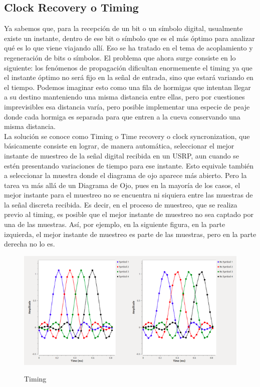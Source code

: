 \subsection{Clock Recovery o Timing}

Ya sabemos que, para la recepción de un bit o un símbolo digital, usualmente existe un instante, dentro de ese bit o símbolo que es el más óptimo para analizar qué es lo que viene viajando allí. Eso se ha tratado en el tema de acoplamiento y regeneración de bits o símbolos. El problema que ahora surge consiste en lo siguiente: los fenómenos de propagación dificultan enormemente el timing ya que el instante óptimo no será fijo en la señal de entrada, sino que estará variando en el tiempo. Podemos imaginar esto como una fila de hormigas que intentan llegar a su destino manteniendo una misma distancia entre ellas, pero por cuestiones imprevisibles esa distancia varía, pero posible implementar una especie de peaje donde cada hormiga es separada para que entren a la cueva conservando una misma distancia. \\

La solución se conoce como Timing o Time recovery o clock syncronization, que básicamente consiste en lograr, de manera automática, seleccionar el mejor instante de muestreo de la señal digital recibida en un USRP, aun cuando se estén presentando variaciones de tiempo para ese instante. Esto equivale también a seleccionar la muestra donde el diagrama de ojo aparece más abierto. Pero la tarea va más allá de un Diagrama de Ojo, pues en la mayoría de los casos, el mejor instante para el muestreo no se encuentra ni siquiera entre las muestras de la señal discreta recibida. Es decir, en el proceso de muestreo, que se realiza previo al timing, es posible que el mejor instante de muestreo no sea captado por una de las muestras. Así, por ejemplo, en la siguiente figura, en la parte izquierda, el mejor instante de muestreo es parte de las muestras, pero en la parte derecha no lo es. \\

\begin{figure}[h!]
	\captionsetup{justification = raggedright, singlelinecheck = false}
	\caption{Timing} 
	\centering
	\includegraphics[scale=1]{Imagenes/Simbolo.png}
	\label{fig:Simbolo}
\end{figure}

